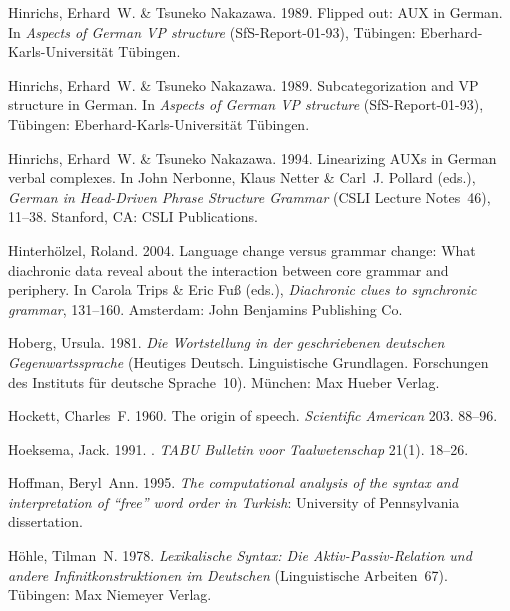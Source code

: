 \begin{thebibliography}{1420}
Hinrichs, Erhard~W. \& Tsuneko Nakazawa. 1989{}.
\newblock Flipped out: {AUX} in {German}.
\newblock In \emph{Aspects of {German} {VP} structure}  (SfS-Report-01-93),
  T\"u\-bing\-en: Eberhard-Karls-Uni\-ver\-si\-t{\"a}t T{\"u}bingen.

Hinrichs, Erhard~W. \& Tsuneko Nakazawa. 1989{}.
\newblock Subcategorization and {VP} structure in {German}.
\newblock In \emph{Aspects of {German} {VP} structure}  (SfS-Report-01-93),
  T\"u\-bing\-en: Eberhard-Karls-Uni\-ver\-si\-t{\"a}t T{\"u}bingen.

Hinrichs, Erhard~W. \& Tsuneko Nakazawa. 1994.
\newblock Linearizing {AUXs} in {German} verbal complexes.
\newblock In John Nerbonne, Klaus Netter \& Carl~J. Pollard (eds.),
  \emph{German in {Head-Driven Phrase Structure Grammar}} (CSLI Lecture
  Notes~46), 11--38. Stanford, CA: CSLI Publications.

Hinterh{\"o}lzel, Roland. 2004.
\newblock Language change versus grammar change: {What} diachronic data reveal
  about the interaction between core grammar and periphery.
\newblock In Carola Trips \& Eric Fu{\ss} (eds.), \emph{Diachronic clues to
  synchronic grammar}, 131--160. Amsterdam: John Benjamins Publishing Co.

Hoberg, Ursula. 1981.
\newblock \emph{{Die Wortstellung in der geschriebenen deutschen
  Gegenwartssprache}} (Heutiges Deutsch. Linguistische Grundlagen. Forschungen
  des Instituts f{\"u}r deutsche Sprache~10).
\newblock M{\"u}nchen: Max Hueber Verlag.

Hockett, Charles~F. 1960.
\newblock The origin of speech.
\newblock \emph{Scientific American} 203. 88--96.

Hoeksema, Jack. 1991.
.
\newblock \emph{TABU Bulletin voor Taalwetenschap} 21(1). 18--26.

Hoffman, Beryl~Ann. 1995.
\newblock \emph{The computational analysis of the syntax and interpretation of
  ``free'' word order in {Turkish}}: University of Pennsylvania dissertation.

H{\"o}hle, Tilman~N. 1978.
\newblock \emph{{Lexikalische Syntax: Die Aktiv-Passiv-Relation und andere
  Infinitkonstruktionen im Deutschen}} (Linguistische Arbeiten~67).
\newblock T{\"u}bingen: Max Niemeyer Verlag.


\end{thebibliography}
